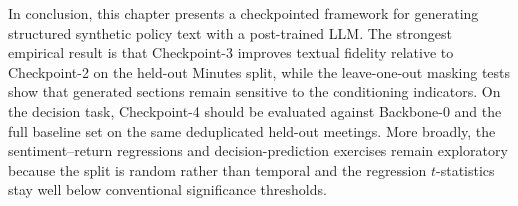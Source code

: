 In conclusion, this chapter presents a checkpointed framework for generating structured synthetic policy text with a post-trained LLM. The strongest empirical result is that Checkpoint-3 improves textual fidelity relative to Checkpoint-2 on the held-out Minutes split, while the leave-one-out masking tests show that generated sections remain sensitive to the conditioning indicators. On the decision task, Checkpoint-4 should be evaluated against Backbone-0 and the full baseline set on the same deduplicated held-out meetings. More broadly, the sentiment--return regressions and decision-prediction exercises remain exploratory because the split is random rather than temporal and the regression $t$-statistics stay well below conventional significance thresholds.


